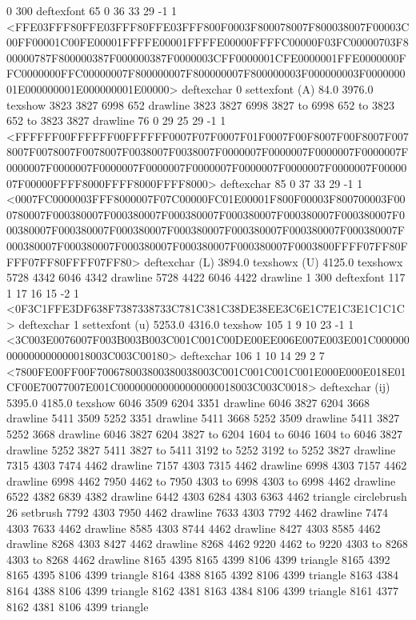 0 300 deftexfont
65 0 36 33 29 -1 1 {{<FFE03FFF80FFE03FFF80FFE03FFF800F0003F800078007F800038007F00003C00FF00001C00FE00001FFFFE00001FFFFE00000FFFFC00000F03FC00000703F800000787F800000387F000000387F0000003CFF0000001CFE0000001FFE0000000FFC0000000FFC00000007F800000007F800000007F800000003F000000003F000000001E000000001E000000001E00000>}} deftexchar
0 settexfont
(A) 84.0 3976.0 texshow
3823 3827 6998 652 drawline
3823 3827 6998 3827 to 6998 652 to 3823 652 to 3823 3827 drawline
76 0 29 25 29 -1 1 {{<FFFFFF00FFFFFF00FFFFFF0007F07F0007F01F0007F00F8007F00F8007F0078007F0078007F0078007F0038007F0038007F0000007F0000007F0000007F0000007F0000007F0000007F0000007F0000007F0000007F0000007F0000007F0000007F0000007F00000FFFF8000FFFF8000FFFF8000>}} deftexchar
85 0 37 33 29 -1 1 {{<0007FC0000003FFF8000007F07C00000FC01E00001F800F00003F800700003F000780007F000380007F000380007F000380007F000380007F000380007F000380007F000380007F000380007F000380007F000380007F000380007F000380007F000380007F000380007F000380007F000380007F000380007F000380007F0003800FFFF07FF80FFFF07FF80FFFF07FF80>}} deftexchar
(L) 3894.0 texshowx
(U) 4125.0 texshowx
5728 4342 6046 4342 drawline
5728 4422 6046 4422 drawline
1 300 deftexfont
117 1 17 16 15 -2 1 {{<0F3C1FFE3DF638F7387338733C781C381C38DE38EE3C6E1C7E1C3E1C1C1C>}} deftexchar
1 settexfont
(u) 5253.0 4316.0 texshow
105 1 9 10 23 -1 1 {{<3C003E0076007F003B003B003C001C001C00DE00EE006E007E003E001C000000000000000000018003C003C00180>}} deftexchar
106 1 10 14 29 2 7 {{<7800FE00FF00F700678003800380038003C001C001C001C001E000E000E018E01CF00E70077007E001C000000000000000000018003C003C0018>}} deftexchar
(ij) 5395.0 4185.0 texshow
6046 3509 6204 3351 drawline
6046 3827 6204 3668 drawline
5411 3509 5252 3351 drawline
5411 3668 5252 3509 drawline
5411 3827 5252 3668 drawline
6046 3827 6204 3827 to 6204 1604 to 6046 1604 to 6046 3827 drawline
5252 3827 5411 3827 to 5411 3192 to 5252 3192 to 5252 3827 drawline
7315 4303 7474 4462 drawline
7157 4303 7315 4462 drawline
6998 4303 7157 4462 drawline
6998 4462 7950 4462 to 7950 4303 to 6998 4303 to 6998 4462 drawline
6522 4382 6839 4382 drawline
6442 4303 6284 4303 6363 4462 triangle
circlebrush 26 setbrush
7792 4303 7950 4462 drawline
7633 4303 7792 4462 drawline
7474 4303 7633 4462 drawline
8585 4303 8744 4462 drawline
8427 4303 8585 4462 drawline
8268 4303 8427 4462 drawline
8268 4462 9220 4462 to 9220 4303 to 8268 4303 to 8268 4462 drawline
8165 4395 8165 4399 8106 4399 triangle
8165 4392 8165 4395 8106 4399 triangle
8164 4388 8165 4392 8106 4399 triangle
8163 4384 8164 4388 8106 4399 triangle
8162 4381 8163 4384 8106 4399 triangle
8161 4377 8162 4381 8106 4399 triangle
